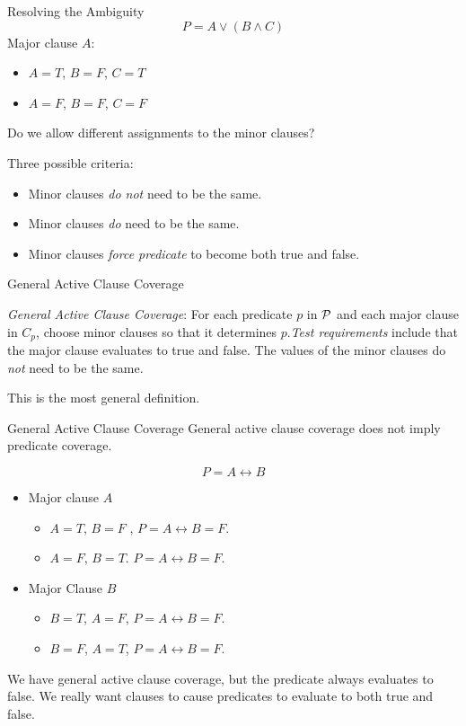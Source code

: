 \documentclass{beamer}
\newcommand{\predset}{{\cal P}}
\begin{document}
\begin{frame}{Resolving the Ambiguity}
\[
P = A \lor (B \land C)
\]
Major clause $A$:
\begin{itemize}
\item $A=T$, $B=F$, $C=T$
\item $A=F$, $B=F$, $C=F$
\end{itemize}
Do we allow different assignments to the minor clauses?

Three possible criteria:
\begin{itemize}
\item Minor clauses {\em do not } need to be the same.
\item Minor clauses {\em do} need to be the same.
\item Minor clauses {\em force predicate} to become both true and false.
\end{itemize}
  
\end{frame}
\begin{frame}{General Active Clause Coverage}

{\em General Active Clause Coverage}: For each predicate $p$ in
$\predset$ and each major clause in $C_p$, choose minor clauses so
that it determines $p$.{\it Test requirements} include that the major
clause evaluates to true and false. The values of the minor clauses do
{\em not} need to be the same.

This is the most general definition. 
\end{frame}
\begin{frame}{General Active Clause Coverage}
General active clause coverage does not imply predicate coverage.

\[
P = A \leftrightarrow B
\]
\begin{itemize}
\item Major clause $A$
  \begin{itemize}
  \item $A=T$, $B=F$ , $P = A\leftrightarrow B = F$.
  \item $A=F$, $B=T$.  $P = A\leftrightarrow B = F$.
  \end{itemize}
\item Major Clause $B$
  \begin{itemize}
  \item $B=T$, $A=F$, $P = A\leftrightarrow B = F$.
  \item $B=F$, $A=T$, $P = A\leftrightarrow B = F$.
  \end{itemize}
\end{itemize}
We have general active clause coverage, but the predicate always
evaluates to false. We really want clauses to cause predicates to
evaluate to both true and false.
  
\end{frame}
\end{document}
